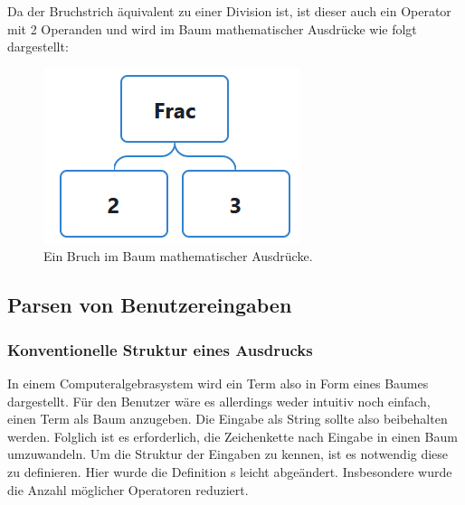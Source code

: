 \documentclass[11pt]{article}
\begin{document}
Da der Bruchstrich äquivalent zu einer Division ist, ist dieser auch ein Operator mit 2 Operanden
und wird im Baum mathematischer Ausdrücke wie folgt dargestellt:

\begin{figure}[h]
  \centering
  \includegraphics[scale=0.5]{trees/beispiel_baum_frac.png}
  \caption{Ein Bruch im Baum mathematischer Ausdrücke.}
\end{figure}

\subsection{Parsen von Benutzereingaben}\label{abschnitt:parsen}

\subsubsection{Konventionelle Struktur eines Ausdrucks}
In einem Computeralgebrasystem wird ein Term also in Form eines Baumes dargestellt. 
Für den Benutzer wäre es allerdings weder intuitiv noch einfach, einen Term als Baum anzugeben. 
Die Eingabe als String sollte also beibehalten werden. 
Folglich ist es erforderlich, die Zeichenkette nach Eingabe in einen Baum umzuwandeln.
Um die Struktur der Eingaben zu kennen, ist es notwendig diese zu definieren. Hier wurde
die Definition \citeauthor{CAS_EA}s \cite[86 - 87]{CAS_EA} leicht abgeändert. Insbesondere
wurde die Anzahl möglicher Operatoren reduziert.
\end{document}
